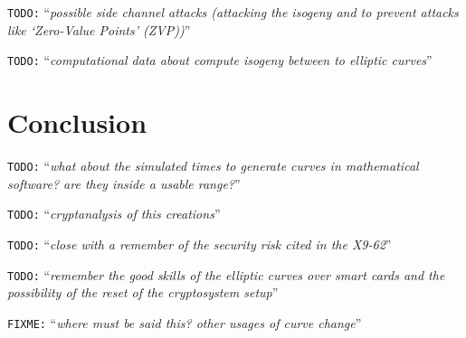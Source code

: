 \documentclass[10pt,a4paper,twoside]{llncs}
\newcommand{\todo}[1]{\texttt{\color{red}TODO:} ``\emph{#1}''}
\newcommand{\fixme}[1]{\texttt{\color{red}FIXME:} ``\emph{#1}''}
\begin{document}
\todo{possible side channel attacks (attacking the isogeny and to prevent attacks like `\emph{Zero-Value Points}' (ZVP))}

\todo{computational data about compute isogeny between to elliptic curves}

\section{Conclusion \label{sec:conclusion}}
\todo{what about the simulated times to generate curves in mathematical software? are they inside a usable range?}

\todo{cryptanalysis of this creations}

\todo{close with a remember of the security risk cited in the X9-62}

\todo{remember the good skills of the elliptic curves over smart cards and the possibility of the reset of the cryptosystem setup}


\fixme{where must be said this? other usages of curve change}





\end{document}
